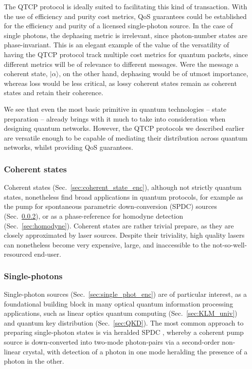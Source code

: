 \documentclass[aps,rmp,twocolumn,amsmath,amssymb,nofootinbib,superscriptaddress,longbibliography,floatfix]{revtex4-1}
\newcommand{\ket}[1]{|#1\rangle}
\begin{document}
The QTCP protocol is ideally suited to facilitating this kind of transaction. With the use of efficiency and purity cost metrics, QoS guarantees could be established for the efficiency and purity of a licensed single-photon source. In the case of single photons, the dephasing metric is irrelevant, since photon-number states are phase-invariant. This is an elegant example of the value of the versatility of having the QTCP protocol track multiple cost metrics for quantum packets, since different metrics will be of relevance to different messages. Were the message a coherent state, $\ket\alpha$, on the other hand, dephasing would be of utmost importance, whereas loss would be less critical, as lossy coherent states remain as coherent states and retain their coherence.

We see that even the most basic primitive in quantum technologies -- state preparation -- already brings with it much to take into consideration when designing quantum networks. However, the QTCP protocols we described earlier are versatile enough to be capable of mediating their distribution across quantum networks, whilst providing QoS guarantees.

%
%

\subsubsection{Coherent states} \label{sec:coherent_states}

Coherent states (Sec.~\ref{sec:coherent_state_enc}), although not strictly quantum states, nonetheless find broad applications in quantum protocols, for example as the pump for spontaneous parametric down-conversion (SPDC) sources (Sec.~\ref{sec:single_phot_src}), or as a phase-reference for homodyne detection (Sec.~\ref{sec:homodyne}). Coherent states are rather trivial prepare, as they are closely approximated by laser sources. Despite their triviality, high quality lasers can nonetheless become very expensive, large, and inaccessible to the not-so-well-resourced end-user.

%
%

\subsubsection{Single-photons} \label{sec:single_phot_src}

Single-photon sources (Sec.~\ref{sec:single_phot_enc}) \cite{bib:Oxborrow05} are of particular interest, as a foundational building block in many optical quantum information processing applications, such as linear optics quantum computing (Sec.~\ref{sec:KLM_univ}) and quantum key distribution (Sec.~\ref{sec:QKD}). The most common approach to preparing single-photon states is via heralded SPDC \cite{bib:URen03, bib:URen05}, whereby a coherent pump source is down-converted into two-mode photon-pairs via a second-order non-linear crystal, with detection of a photon in one mode heralding the presence of a photon in the other.
\end{document}
